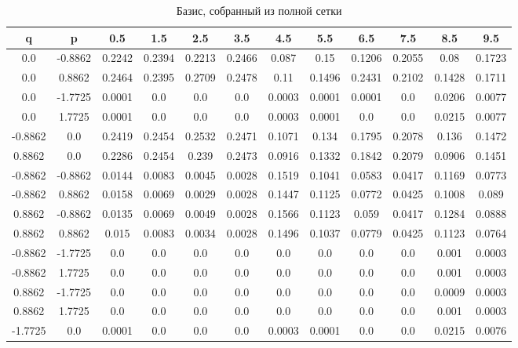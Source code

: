 \documentclass[a4paper,14pt]{extarticle}
\begin{document}
\begin{landscape}
\begin{table}[H]
\centering
\caption{Базис, собранный из полной сетки}
\begin{tabular}{|c|c|*{10}{c}|}
\hline
q       & p       & 0.5    & 1.5    & 2.5    & 3.5    & 4.5    & 5.5    & 6.5    & 7.5    & 8.5    & 9.5    \\
\hline
0.0     & -0.8862 & 0.2242 & 0.2394 & 0.2213 & 0.2466 & 0.087  & 0.15   & 0.1206 & 0.2055 & 0.08   & 0.1723 \\
0.0     & 0.8862  & 0.2464 & 0.2395 & 0.2709 & 0.2478 & 0.11   & 0.1496 & 0.2431 & 0.2102 & 0.1428 & 0.1711 \\ 
0.0     & -1.7725 & 0.0001 & 0.0    & 0.0    & 0.0    & 0.0003 & 0.0001 & 0.0001 & 0.0    & 0.0206 & 0.0077 \\ 
0.0     & 1.7725  & 0.0001 & 0.0    & 0.0    & 0.0    & 0.0003 & 0.0001 & 0.0    & 0.0    & 0.0215 & 0.0077 \\ 
-0.8862 & 0.0     & 0.2419 & 0.2454 & 0.2532 & 0.2471 & 0.1071 & 0.134  & 0.1795 & 0.2078 & 0.136  & 0.1472 \\ 
0.8862  & 0.0     & 0.2286 & 0.2454 & 0.239  & 0.2473 & 0.0916 & 0.1332 & 0.1842 & 0.2079 & 0.0906 & 0.1451 \\ 
-0.8862 & -0.8862 & 0.0144 & 0.0083 & 0.0045 & 0.0028 & 0.1519 & 0.1041 & 0.0583 & 0.0417 & 0.1169 & 0.0773 \\ 
-0.8862 & 0.8862  & 0.0158 & 0.0069 & 0.0029 & 0.0028 & 0.1447 & 0.1125 & 0.0772 & 0.0425 & 0.1008 & 0.089  \\ 
0.8862  & -0.8862 & 0.0135 & 0.0069 & 0.0049 & 0.0028 & 0.1566 & 0.1123 & 0.059  & 0.0417 & 0.1284 & 0.0888 \\ 
0.8862  & 0.8862  & 0.015  & 0.0083 & 0.0034 & 0.0028 & 0.1496 & 0.1037 & 0.0779 & 0.0425 & 0.1123 & 0.0764 \\ 
-0.8862 & -1.7725 & 0.0    & 0.0    & 0.0    & 0.0    & 0.0    & 0.0    & 0.0    & 0.0    & 0.001  & 0.0003 \\ 
-0.8862 & 1.7725  & 0.0    & 0.0    & 0.0    & 0.0    & 0.0    & 0.0    & 0.0    & 0.0    & 0.001  & 0.0003 \\ 
0.8862  & -1.7725 & 0.0    & 0.0    & 0.0    & 0.0    & 0.0    & 0.0    & 0.0    & 0.0    & 0.0009 & 0.0003 \\ 
0.8862  & 1.7725  & 0.0    & 0.0    & 0.0    & 0.0    & 0.0    & 0.0    & 0.0    & 0.0    & 0.001  & 0.0003 \\ 
-1.7725 & 0.0     & 0.0001 & 0.0    & 0.0    & 0.0    & 0.0003 & 0.0001 & 0.0    & 0.0    & 0.0215 & 0.0076 \\ 

\end{tabular}
\end{table}
\end{landscape}
\end{document}

